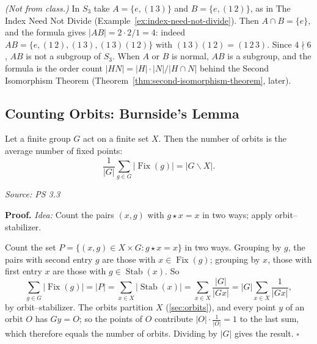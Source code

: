 \documentclass[11pt]{report}
\renewenvironment{proof}[1][Proof]{\noindent\textbf{#1.} }{\hfill$\square$\par\vspace{5pt}}
\newcommand{\srcline}[1]{\par\hfill{\footnotesize\textit{Source: #1}}}
\begin{document}
\begin{exbox}\label{ex:product-set-not-subgroup}
\textit{(Not from class.)} In $S_3$ take $A = \{e, (1\,3)\}$ and $B = \{e, (1\,2)\}$, as in The Index Need Not Divide (Example~\ref{ex:index-need-not-divide}). Then $A \cap B = \{e\}$, and the formula gives $|AB| = 2 \cdot 2 / 1 = 4$: indeed $AB = \{e, (1\,2), (1\,3), (1\,3)(1\,2)\}$ with $(1\,3)(1\,2) = (1\,2\,3)$. Since $4 \nmid 6$, $AB$ is not a subgroup of $S_3$. When $A$ or $B$ is normal, $AB$ is a subgroup, and the formula is the order count $|HN| = |H| \cdot |N| / |H \cap N|$ behind the Second Isomorphism Theorem (Theorem~\ref{thm:second-isomorphism-theorem}, later).
\end{exbox}

\subsection{Counting Orbits: Burnside's Lemma}

\begin{thmbox}\label{thm:burnsides-lemma}
Let a finite group $G$ act on a finite set $X$. Then the number of orbits is the average number of fixed points:
\[ \frac{1}{|G|} \sum_{g \in G} |\operatorname{Fix}(g)| = |G \backslash X|. \]
\srcline{PS 3.3}
\end{thmbox}

\begin{proof}
\textit{Idea:} Count the pairs $(x, g)$ with $g \star x = x$ in two ways; apply orbit--stabilizer.\par
Count the set $P = \{(x, g) \in X \times G : g \star x = x\}$ in two ways. Grouping by $g$, the pairs with second entry $g$ are those with $x \in \operatorname{Fix}(g)$; grouping by $x$, those with first entry $x$ are those with $g \in \operatorname{Stab}(x)$. So
\[ \sum_{g \in G} |\operatorname{Fix}(g)| = |P| = \sum_{x \in X} |\operatorname{Stab}(x)| = \sum_{x \in X} \frac{|G|}{|Gx|} = |G| \sum_{x \in X} \frac{1}{|Gx|}, \]
by orbit--stabilizer. The orbits partition $X$ (\ref{sec:orbits}), and every point $y$ of an orbit $O$ has $Gy = O$; so the points of $O$ contribute $|O| \cdot \frac{1}{|O|} = 1$ to the last sum, which therefore equals the number of orbits. Dividing by $|G|$ gives the result.
\end{proof}
\end{document}
